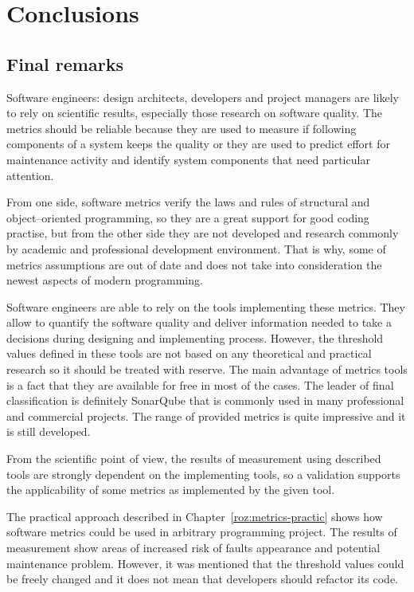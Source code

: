 \chapter{Conclusions} \label{roz:conclusion}

\section{Final remarks}
Software engineers: design architects, developers and project managers are likely to rely on scientific results, especially those research on software quality. The metrics should be reliable because they are used to measure if following components of a system keeps the quality or they are used to predict effort for maintenance activity and identify system components that need particular attention. 

From one side, software metrics verify the laws and rules of structural and object--oriented programming, so they are a great support for good coding practise, but from the other side they are not developed and research commonly by academic and professional development environment. That is why, some of metrics assumptions are out of date and does not take into consideration the newest aspects of modern programming.

Software engineers are able to rely on the tools implementing these metrics. They allow to quantify the software quality and deliver information needed to take a decisions during designing and implementing process. However, the threshold values defined in these tools are not based on any theoretical and practical research so it should be treated with reserve. The main advantage of metrics tools is a fact that they are available for free in most of the cases. The leader of final classification is definitely SonarQube that is commonly used in many professional and commercial projects. The range of provided metrics is quite impressive and it is still developed. 

From the scientific point of view, the results of measurement using described tools are strongly dependent on the implementing tools, so a validation supports the applicability of some metrics as implemented by the given tool. 

The practical approach described in Chapter~\ref{roz:metrics-practic} shows how software metrics could be used in arbitrary programming project. The results of measurement show areas of increased risk of faults appearance and potential maintenance problem. However, it was mentioned that the threshold values could be freely changed and it does not mean that developers should refactor its code. 

